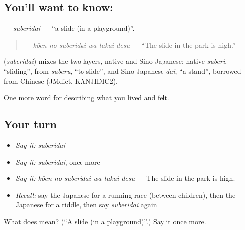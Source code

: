 \subsection*{You'll want to know: }
\textbf{} — \emph{suberidai} — \textquotedblleft{}a slide (in a playground)\textquotedblright{}.

\begin{quote}
\textbf{  } — \emph{kōen no suberidai wa takai desu} — \textquotedblleft{}The slide in the park is high.\textquotedblright{}
\end{quote}

\begin{cousinweb}
\textbf{} (\emph{suberidai}) mixes the two layers, native and Sino-Japanese: native \emph{suberi}, \textquotedblleft{}sliding\textquotedblright{}, from \emph{suberu}, \textquotedblleft{}to slide\textquotedblright{}, and Sino-Japanese \emph{dai}, \textquotedblleft{}a stand\textquotedblright{}, borrowed from Chinese (JMdict, KANJIDIC2).
\end{cousinweb}

\begin{grammarlens}[title={What you've built}]
One more word for describing what you lived and felt.
\end{grammarlens}

\subsection*{Your turn}
\begin{itemize}
\raggedright
  \item \emph{Say it:} \emph{suberidai}
  \item \emph{Say it:} \emph{suberidai}, once more
  \item \emph{Say it:} \emph{kōen no suberidai wa takai desu} — The slide in the park is high.
  \item \emph{Recall:} say the Japanese for a running race (between children), then the Japanese for a riddle, then say \emph{suberidai} again
\end{itemize}

\begin{tcolorbox}[breakable,colback=teal!4,colframe=teal!35!black,title={Before you move on}]
What does  mean? (\textquotedblleft{}A slide (in a playground)\textquotedblright{}.) Say it once more.
\end{tcolorbox}
